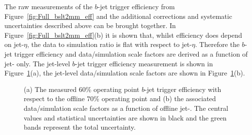 \clearpage

The raw measurements of the $b$-jet trigger efficiency from Figure~\ref{fig:Full_bslt2mm_eff}
and the additional corrections and systematic uncertainties described above can be brought together.
In Figure~\ref{fig:Full_bslt2mm_eff}(b) it is shown that, whilst efficiency does depend on jet-$\eta$,
the data to simulation ratio is flat with respect to jet-$\eta$.
Therefore the $b$-jet trigger efficiency and data/simulation scale factors are derived as a function of jet-\pT{} only. 
The jet-level $b$-jet trigger efficiency measurement is shown in Figure~\ref{fig:bTrig_jetSys}(a),
the jet-level data/simulation scale factors are shown in Figure~\ref{fig:bTrig_jetSys}(b).

\begin{figure}[!ht]
  \begin{center}
    \captionsetup[subfigure]{aboveskip=0pt,justification=centering}
     \hspace{-5mm}

  \end{center}
\vspace{-1em}
  \caption[
    The $b$-jet trigger efficiency measured in data and the associated data/simulation scale factors as a function of offline jet-\pT.]
          {\label{fig:bTrig_jetSys}
    (a) The measured 60\% operating point $b$-jet trigger efficiency with respect to the offline 70\% operating point
    and (b) the associated data/simulation scale factors as a function of offline jet-\pT.
    The central values and statistical uncertainties are shown in black and the green bands represent the total uncertainty.}
\end{figure}
